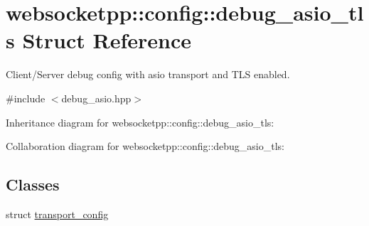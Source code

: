 \hypertarget{structwebsocketpp_1_1config_1_1debug__asio__tls}{}\section{websocketpp\+:\+:config\+:\+:debug\+\_\+asio\+\_\+tls Struct Reference}
\label{structwebsocketpp_1_1config_1_1debug__asio__tls}


Client/\+Server debug config with asio transport and T\+LS enabled.  




{\ttfamily \#include $<$debug\+\_\+asio.\+hpp$>$}



Inheritance diagram for websocketpp\+:\+:config\+:\+:debug\+\_\+asio\+\_\+tls\+:


Collaboration diagram for websocketpp\+:\+:config\+:\+:debug\+\_\+asio\+\_\+tls\+:
\subsection*{Classes}
\begin{DoxyCompactItemize}
\item 
struct \mbox{\hyperlink{structwebsocketpp_1_1config_1_1debug__asio__tls_1_1transport__config}{transport\+\_\+config}}
\end{DoxyCompactItemize}
